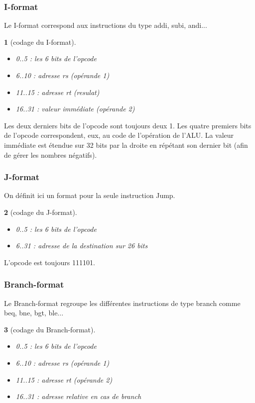\documentclass[13pt]{article}
\newtheorem{format}{  }
\begin{document}
\subsubsection{I-format}

Le I-format correspond aux instructions du type addi, subi, andi...

\begin{format}[codage du I-format]
  \begin{itemize}
  \item 0..5 : les 6 bits de l'opcode
  \item 6..10 : adresse rs (opérande 1)
  \item 11..15 : adresse rt (resulat)
  \item 16..31 : valeur immédiate (opérande 2)
  \end{itemize}
\end{format}

Les deux derniers bits de l'opcode sont toujours deux 1.
Les quatre premiers bits de l'opcode correspondent, eux, au code
de l'opération de l'ALU. La valeur immédiate est étendue sur 
32 bits par la droite en répétant son dernier bit 
(afin de gérer les nombres négatifs).

\subsubsection{J-format}

On définit ici un format pour la seule instruction Jump.

\begin{format}[codage du J-format]
  \begin{itemize}
  \item 0..5 : les 6 bits de l'opcode
  \item 6..31 : adresse de la destination sur 26 bits
  \end{itemize}
\end{format}

L'opcode est toujours 111101. 

\subsubsection{Branch-format}

Le Branch-format regroupe les différentes instructions
de type branch comme beq, bne, bgt, ble...

\begin{format}[codage du Branch-format]
  \begin{itemize}
  \item 0..5 : les 6 bits de l'opcode
  \item 6..10 : adresse rs (opérande 1)
  \item 11..15 : adresse rt (opérande 2)
  \item 16..31 : adresse relative en cas de branch
  \end{itemize}
\end{format}
\end{document}
